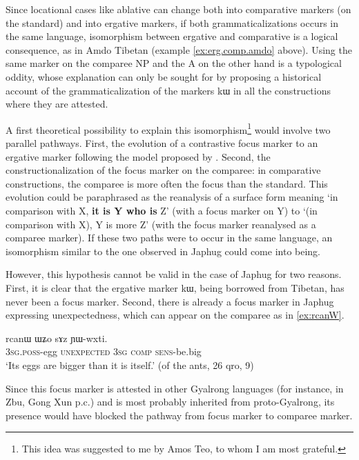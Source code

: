 \documentclass[oldfontcommands,oneside,a4paper,11pt]{article}
\newcommand{\ipa}[1]{{\phon #1}} %
\begin{document}
Since   locational cases like ablative can change both into comparative markers (on the standard) and  into ergative markers, if both grammaticalizations occurs in the same language, isomorphism between ergative and comparative is a logical consequence, as in Amdo Tibetan (example \ref{ex:erg.comp.amdo} above).
Using the same marker on the comparee NP and the A on the other hand is a typological oddity, whose explanation can only be sought for by proposing a historical account of the grammaticalization of the markers \ipa{kɯ} in all the constructions where they are attested.

A first theoretical possibility to explain this isomorphism\footnote{This idea was suggested to me by Amos Teo, to whom I am most grateful.} would involve two parallel pathways. First, the evolution of a contrastive focus marker to an ergative marker following the model proposed by \citet{gaby10thaayorre.ergative}. Second, the constructionalization of the focus marker on the comparee: in comparative constructions, the comparee is more often the focus than the standard. This evolution could be paraphrased as the reanalysis of a surface form meaning `in comparison with X, \textbf{it is Y who is}  Z' (with a focus marker on Y) to  `(in comparison with X), Y is more  Z' (with the focus marker reanalysed as a comparee marker). 
If these two paths were to occur in the same language, an isomorphism similar to the one observed in Japhug could come into being.

However, this hypothesis cannot be valid in the case of Japhug for two reasons. First, it is clear that the ergative marker \ipa{kɯ}, being borrowed from Tibetan, has never been a focus marker. Second,  there is already a focus marker in Japhug expressing unexpectedness, which can appear on the comparee as in \ref{ex:rcanW}.

\begin{exe}
\ex \label{ex:rcanW}
\gll   \ipa{ɯ-ŋgɯm} 	\ipa{rcanɯ} 	\ipa{ɯʑo} 	\ipa{sɤz} 	\ipa{ɲɯ-wxti.} 	 \\
\textsc{3sg.poss}-egg \textsc{unexpected} \textsc{3sg} \textsc{comp} \textsc{sens}-be.big \\
\glt `Its eggs are bigger than it is itself.' (of the ants, 26 qro, 9)
\end{exe}

Since this focus marker is attested in other Gyalrong languages (for instance, in Zbu, Gong Xun p.c.) and is most probably inherited from proto-Gyalrong, its presence would have blocked the pathway from focus marker to  comparee marker. 
\end{document}
